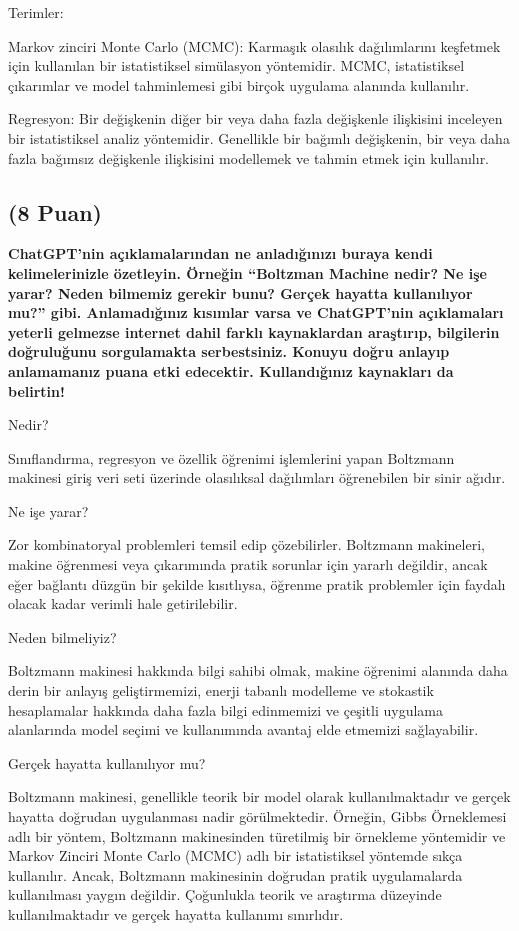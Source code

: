 \documentclass[11pt]{article}
\begin{document}
Terimler:

Markov zinciri Monte Carlo (MCMC): Karmaşık olasılık dağılımlarını keşfetmek için kullanılan bir istatistiksel simülasyon yöntemidir. MCMC, istatistiksel çıkarımlar ve model tahminlemesi gibi birçok uygulama alanında kullanılır.

Regresyon: Bir değişkenin diğer bir veya daha fazla değişkenle ilişkisini inceleyen bir istatistiksel analiz yöntemidir. Genellikle bir bağımlı değişkenin, bir veya daha fazla bağımsız değişkenle ilişkisini modellemek ve tahmin etmek için kullanılır.


\subsection{(8 Puan)} \textbf{ChatGPT’nin açıklamalarından ne anladığınızı buraya kendi kelimelerinizle özetleyin. Örneğin ``Boltzman Machine nedir? Ne işe yarar? Neden bilmemiz gerekir bunu? Gerçek hayatta kullanılıyor mu?'' gibi. Anlamadığınız kısımlar varsa ve ChatGPT’nin açıklamaları yeterli gelmezse internet dahil farklı kaynaklardan araştırıp, bilgilerin doğruluğunu sorgulamakta serbestsiniz. Konuyu doğru anlayıp anlamamanız puana etki edecektir. Kullandığınız kaynakları da belirtin!}


Nedir?

Sınıflandırma, regresyon ve özellik öğrenimi işlemlerini yapan Boltzmann makinesi giriş veri seti üzerinde olasılıksal dağılımları öğrenebilen bir sinir ağıdır.

Ne işe yarar?

Zor kombinatoryal problemleri temsil edip çözebilirler. Boltzmann makineleri, makine öğrenmesi veya çıkarımında pratik sorunlar için yararlı değildir, ancak eğer bağlantı düzgün bir şekilde kısıtlıysa, öğrenme pratik problemler için faydalı olacak kadar verimli hale getirilebilir.

Neden bilmeliyiz?

Boltzmann makinesi hakkında bilgi sahibi olmak, makine öğrenimi alanında daha derin bir anlayış geliştirmemizi, enerji tabanlı modelleme ve stokastik hesaplamalar hakkında daha fazla bilgi edinmemizi ve çeşitli uygulama alanlarında model seçimi ve kullanımında avantaj elde etmemizi sağlayabilir.

Gerçek hayatta kullanılıyor mu?

Boltzmann makinesi, genellikle teorik bir model olarak kullanılmaktadır ve gerçek hayatta doğrudan uygulanması nadir görülmektedir. Örneğin, Gibbs Örneklemesi adlı bir yöntem, Boltzmann makinesinden türetilmiş bir örnekleme yöntemidir ve Markov Zinciri Monte Carlo (MCMC) adlı bir istatistiksel yöntemde sıkça kullanılır. Ancak, Boltzmann makinesinin doğrudan pratik uygulamalarda kullanılması yaygın değildir. Çoğunlukla teorik ve araştırma düzeyinde kullanılmaktadır ve gerçek hayatta kullanımı sınırlıdır.
\end{document}
